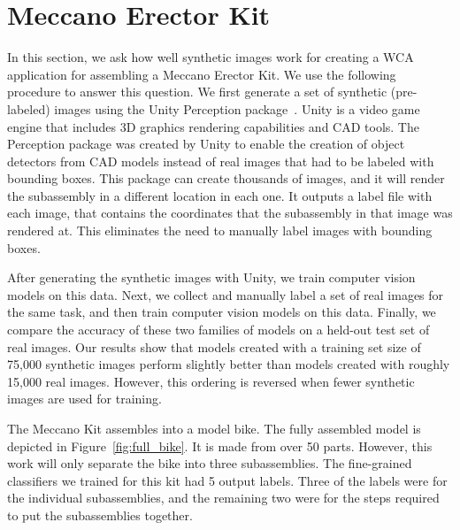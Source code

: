 \section{Meccano Erector Kit}

In this section, we ask how well synthetic images work for creating a WCA
application for assembling a Meccano Erector Kit.
We use the following procedure to answer this
question.  We first generate a set of synthetic (pre-labeled) images
using the Unity Perception package~\cite{unity}.
Unity is a video game engine that includes 3D graphics rendering capabilities
and CAD tools.
The Perception package was created by Unity to enable the creation of object
detectors from CAD models instead of real images that had to be labeled with
bounding boxes.
This package can create thousands of images, and it will render the subassembly
in a different location in each one.
It outputs a label file with each image, that contains the coordinates that the
subassembly in that image was rendered at.
This eliminates the need to manually label images with bounding boxes.

After generating the synthetic images with Unity, we train
computer vision models on this data.  Next, we  collect and manually
label a set of real images for the same task, and then train computer
vision models on this data.  Finally, we compare the accuracy of these
two families of models on a held-out test set of real images.  Our
results show that models created with a training set size of 75,000
synthetic images perform slightly better than models created with
roughly 15,000 real images.
However, this ordering is reversed when fewer synthetic images are used for
training.

The Meccano Kit assembles into a model bike.
The fully assembled model is depicted in Figure~\ref{fig:full_bike}.
It is made from over 50 parts.
However, this work will only separate the bike into three subassemblies.
The fine-grained classifiers we trained for this kit had 5 output labels.
Three of the labels were for the individual subassemblies, and the remaining two
were for the steps required to put the subassemblies together.


